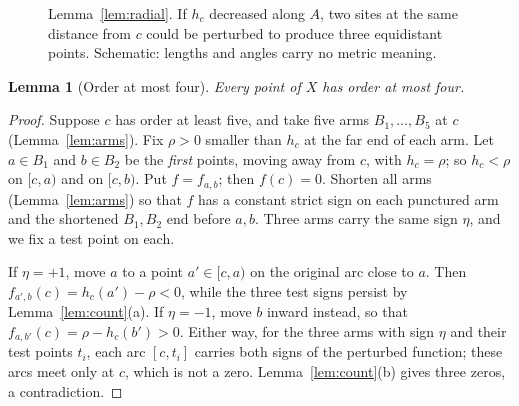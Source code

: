 \documentclass[11pt]{amsart}
\newtheorem{lemma}[theorem]{Lemma}
\theoremstyle{definition}
\theoremstyle{remark}
\begin{document}
\begin{figure}[ht]
\centering
{}
\caption{Lemma~\ref{lem:radial}. If $h_c$ decreased along $A$, two sites at the same distance from $c$ could be perturbed to produce three equidistant points. Schematic: lengths and angles carry no metric meaning.}\label{fig:radial}
\end{figure}

\begin{lemma}[Order at most four]\label{lem:order}
Every point of $X$ has order at most four.
\end{lemma}
\begin{proof}
Suppose $c$ has order at least five, and take five arms $B_1,\dots,B_5$ at $c$ (Lemma~\ref{lem:arms}). Fix $\rho>0$ smaller than $h_c$ at the far end of each arm. Let $a\in B_1$ and $b\in B_2$ be the \emph{first} points, moving away from $c$, with $h_c=\rho$; so $h_c<\rho$ on $[c,a)$ and on $[c,b)$. Put $f=f_{a,b}$; then $f(c)=0$. Shorten all arms (Lemma~\ref{lem:arms}) so that $f$ has a constant strict sign on each punctured arm and the shortened $B_1,B_2$ end before $a,b$. Three arms carry the same sign $\eta$, and we fix a test point on each.

If $\eta=+1$, move $a$ to a point $a'\in[c,a)$ on the original arc close to $a$. Then $f_{a',b}(c)=h_c(a')-\rho<0$, while the three test signs persist by Lemma~\ref{lem:count}(a). If $\eta=-1$, move $b$ inward instead, so that $f_{a,b'}(c)=\rho-h_c(b')>0$. Either way, for the three arms with sign $\eta$ and their test points $t_i$, each arc $[c,t_i]$ carries both signs of the perturbed function; these arcs meet only at $c$, which is not a zero. Lemma~\ref{lem:count}(b) gives three zeros, a contradiction.
\end{proof}
\end{document}
